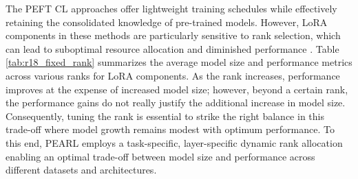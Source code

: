 \documentclass[10pt]{article} %
\begin{document}
The PEFT CL approaches offer lightweight training schedules while effectively retaining the consolidated knowledge of pre-trained models. However, LoRA components in these methods are particularly sensitive to rank selection, which can lead to suboptimal resource allocation and diminished performance \citep{valipour2022dylora}. Table \ref{tab:r18_fixed_rank} summarizes the average model size and performance metrics across various ranks for LoRA components. As the rank increases, performance improves at the expense of increased model size; however, beyond a certain rank, the performance gains do not really justify the additional increase in model size. Consequently, tuning the rank is essential to strike the right balance in this trade-off where model growth remains modest with optimum performance. To this end, PEARL employs a task-specific, layer-specific dynamic rank allocation  enabling an optimal trade-off between model size and performance across different datasets and architectures. 
\end{document}
